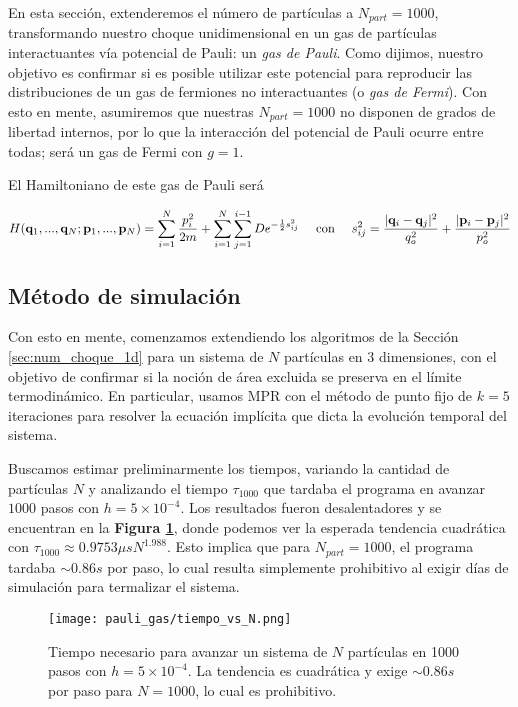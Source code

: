 En esta sección, extenderemos el número de partículas a $N_{part}=1000$, transformando nuestro choque unidimensional en un gas de partículas interactuantes vía potencial
de Pauli: un \textit{gas de Pauli}.
Como dijimos, nuestro objetivo es confirmar si es posible utilizar este potencial para reproducir las distribuciones de un gas de fermiones no interactuantes (o \textit{gas de Fermi}).
Con esto en mente, asumiremos que nuestras $N_{part}=1000$ no disponen de grados de libertad internos, por lo que la interacción del potencial de Pauli ocurre entre todas; 
será un gas de Fermi con $g=1$.

El Hamiltoniano de este gas de Pauli será

\begin{equation}{\label{eq:pauli_gas_ham}}
 H(\mathbf{q}_1, ...,\mathbf{q}_N; \mathbf{p}_1,..., \mathbf{p}_N) = \sum_{i=1}^{N} \frac{p_i^2}{2m} + \sum_{i=1}^N\sum_{j=1}^{i-1} De^{-\frac{1}{2}s_{ij}^2}
 \quad \text{ con } \quad s_{ij}^2 = \frac{|\mathbf{q}_i-\mathbf{q}_j|^2}{q_o^2} + \frac{|\mathbf{p}_i-\mathbf{p}_j|^2}{p_o^2}
\end{equation}

\subsection{Método de simulación}

Con esto en mente, comenzamos extendiendo los algoritmos de la Sección \ref{sec:num_choque_1d} para un sistema de $N$ partículas en 3 dimensiones, con el objetivo
de confirmar si la noción de área excluida se preserva en el límite termodinámico.
En particular, usamos MPR con el método de punto fijo de $k=5$ iteraciones para resolver la ecuación implícita que dicta la evolución temporal del sistema.

Buscamos estimar preliminarmente los tiempos, variando la cantidad de partículas $N$ y analizando el tiempo $\tau_{1000}$ que tardaba el programa en avanzar
$1000$ pasos con $h=5\times10^{-4}$.
Los resultados fueron desalentadores y se encuentran en la \textbf{Figura \ref{fig:tiempo_vs_N}}, donde podemos ver la esperada tendencia cuadrática con
$\tau_{1000} \approx 0.9753\mu s N^{1.988}$.
Esto implica que para $N_{part}=1000$, el programa tardaba $\sim0.86s$ por paso, lo cual resulta simplemente prohibitivo al exigir días de simulación para termalizar el sistema.

\begin{figure}[h]
	\centering
	\texttt{[image: pauli\_gas/tiempo\_vs\_N.png]}
	\caption{Tiempo necesario para avanzar un sistema de $N$ partículas en 1000 pasos con $h=5\times10^{-4}$.
	La tendencia es cuadrática y exige $\sim0.86s$ por paso para $N=1000$, lo cual es prohibitivo.}
	\label{fig:tiempo_vs_N}
\end{figure}

